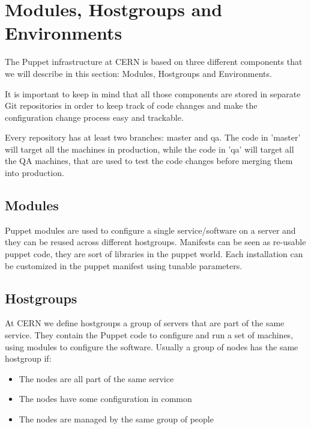 \section{Modules, Hostgroups and Environments}

The Puppet infrastructure at CERN is based on three different components
that we will describe in this section: Modules, Hostgroups and
Environments.

It is important to keep in mind that all those components are stored in
separate Git repositories in order to keep track of code changes and make
the configuration change process easy and trackable.

Every repository has at least two branches: master and qa. The code in
'master' will target all the machines in production, while the code in
'qa' will target all the QA machines, that are used to test the code
changes before merging them into production.

\subsection{Modules}

Puppet modules are used to configure a single service/software on a server
and they can be reused across different hostgroups. Manifests can be seen
as re-usable puppet code, they are sort of libraries in the puppet world.
Each installation can be customized in the puppet manifest using tunable
parameters.


\subsection{Hostgroups}

At CERN we define hostgroups a group of servers that are part of the same
service. They contain the Puppet code to configure and run a set of
machines, using modules to configure the software. Usually a group of
nodes has the same hostgroup if:

\begin{itemize}

\item The nodes are all part of the same service

\item The nodes have some configuration in common

\item The nodes are managed by the same group of people

\end{itemize}

